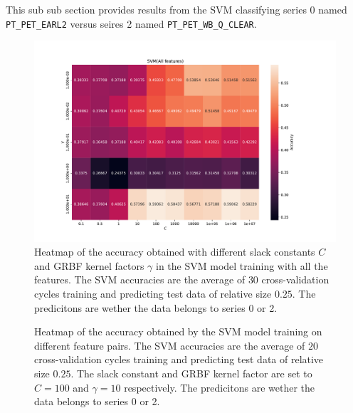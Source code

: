 This sub sub section provides results from the SVM classifying series 0 named \verb|PT_PET_EARL2|
versus seires 2 named \verb|PT_PET_WB_Q_CLEAR|. 

\begin{figure}[H]
\centering
\includegraphics[width=1\textwidth]{Figures/accuracy(C,gamma)1}
\caption{Heatmap of the accuracy obtained with different slack constants $C$ and 
GRBF kernel factors $\gamma $ in the SVM model training with all the features. The SVM accuracies are the average of $30$ cross-validation 
cycles training and predicting test data of relative size $0.25$.
 The predicitons are wether the data belongs to series 0 or 2.}

\label{fig:Figures-accuracy-C-gamma-1}
\end{figure}

\begin{figure}[H]
\centering
{}
\caption{Heatmap of the accuracy obtained by the SVM model training on different feature pairs. The SVM accuracies are the average 
of $20$ cross-validation cycles training and predicting test data of relative size $0.25$.
The slack constant and GRBF kernel factor are set to $C=100$ and $\gamma=10 $ respectively. 
 The predicitons are wether the data belongs to series 0 or 2.}
\label{fig:Figures-feature_pairs1}
\end{figure}

